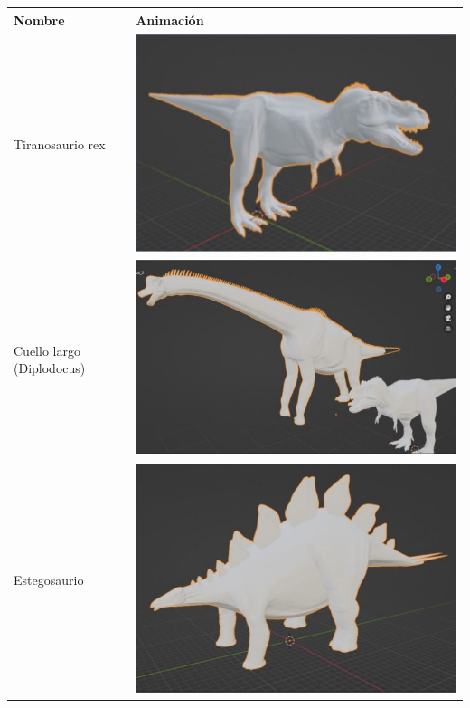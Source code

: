 \documentclass[12pt]{article} %
\begin{document}
	\begin{center}
		\begin{tabular}{ | m{19em} | m{19em} | }
			\hline
			Nombre & Animación  \\ 
			\hline
		 	Tiranosaurio rex &
		 	\includegraphics[scale=0.5]{images/Tiranosaurio.JPG} \\  
		 	\hline
		 	Cuello largo (Diplodocus) &
		 	\includegraphics[scale=0.5]{images/Diplodocus.JPG} \\
		 	\hline
		 	Estegosaurio &
		 	\includegraphics[scale=0.5]{images/Estegosaurio.JPG} \\  
			\hline
		\end{tabular}
	\end{center}
\end{document}
